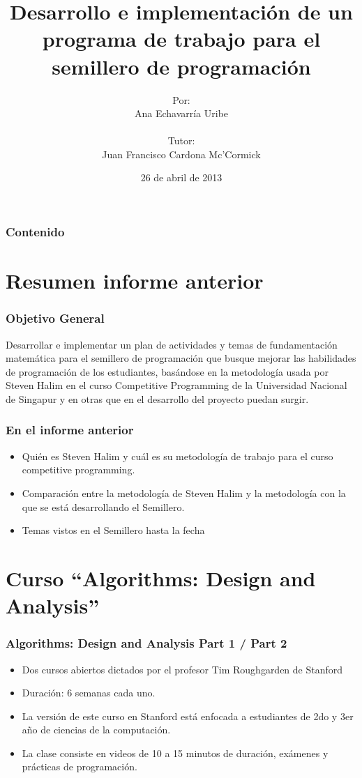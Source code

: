 \documentclass{beamer}
\title{Desarrollo e implementación de un programa de trabajo para el semillero de programación}
\author{Por: \\ Ana Echavarría Uribe \\ \quad \\ Tutor: \\ Juan Francisco Cardona Mc'Cormick}
\institute{Universidad EAFIT}
\date{26 de abril de 2013}
\begin{document}
\begin{frame}
	\titlepage
\end{frame}

\begin{frame}
	\frametitle{Contenido}
	\tableofcontents
\end{frame}

\section[Informe anterior]{Resumen informe anterior}

	\begin{frame}
		\frametitle{Objetivo General}
		\begin{block}{}
			Desarrollar e implementar un plan de actividades y temas de fundamentación matemática para el semillero de programación que busque mejorar las habilidades de programación de los estudiantes, basándose en la metodología usada por Steven Halim en el curso Competitive Programming de la Universidad Nacional de Singapur y en otras que en el desarrollo del proyecto puedan surgir.
		\end{block}
	\end{frame}
	
	\begin{frame}
		\frametitle{En el informe anterior}
		\begin{itemize}
			\item Quién es Steven Halim y cuál es su metodología de trabajo para el curso competitive programming.
			\item Comparación entre la metodología de Steven Halim y la metodología con la que se está desarrollando el Semillero.
			\item Temas vistos en el Semillero hasta la fecha
		\end{itemize}
	\end{frame}

\section[Curso Stanford]{Curso ``Algorithms: Design and Analysis'' }

	\begin{frame}
		\frametitle{Algorithms: Design and Analysis Part 1 / Part 2}
		\begin{itemize}
			\item Dos cursos abiertos dictados por el profesor Tim Roughgarden de Stanford
			\item Duración: 6 semanas cada uno.
			\item La versión de este curso en Stanford está enfocada a estudiantes de 2do y 3er año de ciencias de la computación.
			\item La clase consiste en videos de 10 a 15 minutos de duración, exámenes y prácticas de programación.
		\end{itemize}	
	\end{frame}
	
\end{document}
